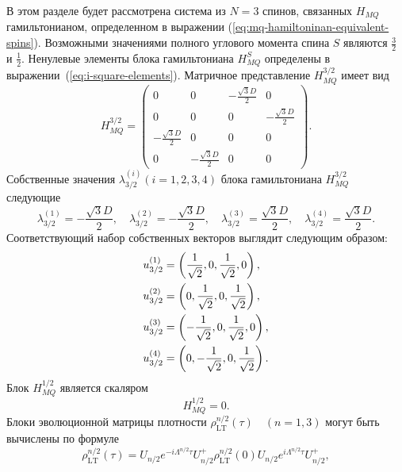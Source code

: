 В этом разделе будет рассмотрена система из $N=3$ спинов,
связанных $H_{MQ}$ гамильтонианом,
определенном в выражении (\ref{eq:mq-hamiltoninan-equivalent-spins}).
Возможными значениями полного углового момента спина $S$
являются $\frac 3 2$ и $\frac 1 2$.
Ненулевые элементы блока гамильтониана $H_{MQ}^{S}$ определены в выражении~(\ref{eq:i-square-elements}).
Матричное представление $H_{MQ}^{3/2}$ имеет вид
%
\begin{equation}
    \label{eq:ham_3_2}
    H_{MQ}^{3/2} =
    \begin{pmatrix}
        0 & 0 & -\frac{\sqrt{3} D}{2} & 0 \\
        0 & 0 & 0 & -\frac{\sqrt{3} D}{2} \\
        -\frac{\sqrt{3} D}{2} & 0 & 0 & 0 \\
        0 & -\frac{\sqrt{3} D}{2} & 0 & 0
    \end{pmatrix}.
\end{equation}
%
Собственные значения $\lambda_{3/2}^{(i)}(i=1, 2, 3, 4)$
блока гамильтониана $H_{MQ}^{3/2}$ следующие
%
\begin{equation}\label{eq:eigvals_3_2}
  \lambda_{3/2}^{(1)} = -\frac{\sqrt{3} D}{2}, \quad
  \lambda_{3/2}^{(2)} = -\frac{\sqrt{3} D}{2}, \quad
  \lambda_{3/2}^{(3)} = \frac{\sqrt{3} D}{2}, \quad
  \lambda_{3/2}^{(4)} = \frac{\sqrt{3} D}{2}.
\end{equation}
%
Соответствующий набор собственных векторов выглядит следующим образом:
%
\begin{align}\label{eq:eigvecs_3_2}
  u_{3/2}^{(1)} & =  \left(\frac{1}{\sqrt{2}}, 0, \frac{1}{\sqrt{2}}, 0\right) ,
  \notag \\
  u_{3/2}^{(2)} & =  \left(0, \frac{1}{\sqrt{2}}, 0, \frac{1}{\sqrt{2}}\right) ,
  \notag \\
  u_{3/2}^{(3)} & =  \left(-\frac{1}{\sqrt{2}}, 0, \frac{1}{\sqrt{2}}, 0\right) ,
  \notag \\
  u_{3/2}^{(4)} & =  \left(0, -\frac{1}{\sqrt{2}}, 0, \frac{1}{\sqrt{2}}\right) .
\end{align}
%
Блок $H^{1/2}_{MQ}$ является скаляром
%
\begin{equation}\label{eq:ham_1_2}
  H^{1/2}_{MQ} = 0.
\end{equation}
%
Блоки эволюционной матрицы плотности $\rho_\mathrm{LT}^{n/2}(\tau) \quad (n = 1, 3)$
могут быть вычислены по формуле
%
\begin{equation}\label{eq:liouvile_sol}
  \rho_\mathrm{LT}^{n/2}(\tau) =
  U_{n/2} e^{-i\Lambda^{n/2}\tau} U^{+}_{n/2}
  \rho^{n/2}_\mathrm{LT}(0)
  U_{n/2} e^{i\Lambda^{n/2}\tau} U^{+}_{n/2},
\end{equation}
